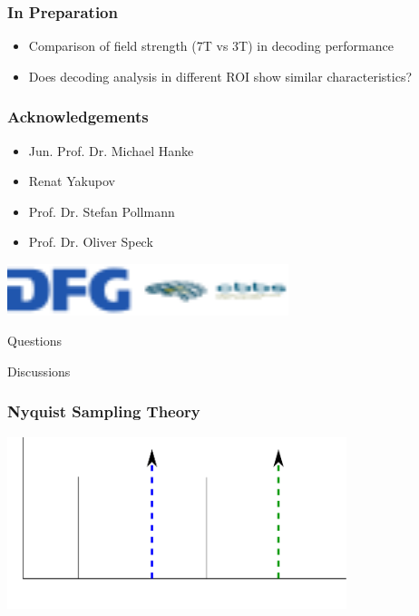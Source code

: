 \documentclass{beamer}
\begin{document}
  \begin{frame}
    \frametitle{In Preparation}
        \begin{center}
        \begin{itemize}
         \item Comparison of field strength (7T vs 3T) in decoding performance
         \item Does decoding analysis in different ROI show similar characteristics?
        \end{itemize}  
        \end{center}
    \end{frame} 




  \begin{frame}
    \frametitle{Acknowledgements}
        \begin{itemize}
         \item Jun. Prof. Dr. Michael Hanke
         \item Renat Yakupov
         \item Prof. Dr. Stefan Pollmann
         \item Prof. Dr. Oliver Speck
        \end{itemize}
        \vspace{1cm}
        \begin{center} 
            \includegraphics[height=1.5cm]{../pictures/funding}
        \end{center}
    \end{frame}


  \begin{frame}
        \begin{center}
            Questions
        \end{center}
    \end{frame} 


  \begin{frame}
        \begin{center}
            Discussions
        \end{center}
    \end{frame}

    
  \begin{frame}
    \frametitle{Nyquist Sampling Theory}
        \begin{center}
            \includegraphics[height=5cm]{../pictures/nyquist}
        \end{center}
    \end{frame}   
\end{document}
